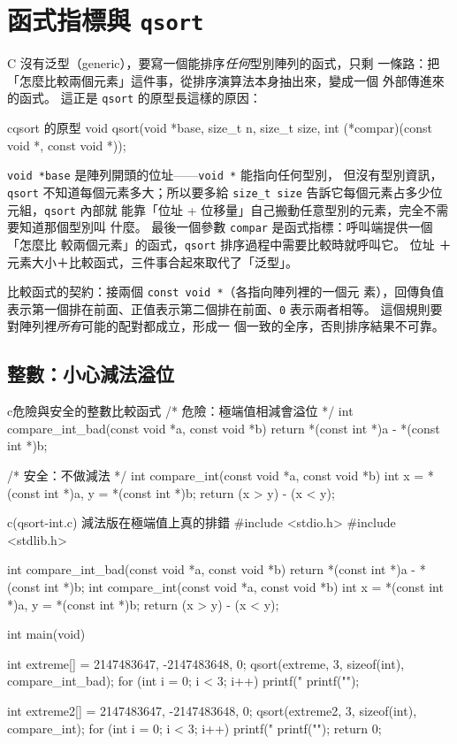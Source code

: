 \section{函式指標與 \texttt{qsort}}
\label{sec:sl-qsort}

C 沒有泛型（generic），要寫一個能排序\textit{任何}型別陣列的函式，只剩
一條路：把「怎麼比較兩個元素」這件事，從排序演算法本身抽出來，變成一個
外部傳進來的函式。 這正是 \texttt{qsort} 的原型長這樣的原因：

\begin{code}{c}{qsort 的原型}
void qsort(void *base, size_t n, size_t size,
           int (*compar)(const void *, const void *));
\end{code}

\texttt{void *base} 是陣列開頭的位址——\texttt{void *} 能指向任何型別，
但沒有型別資訊，\texttt{qsort} 不知道每個元素多大；所以要多給
\texttt{size\_t size} 告訴它每個元素占多少位元組，\texttt{qsort} 內部就
能靠「位址 + 位移量」自己搬動任意型別的元素，完全不需要知道那個型別叫
什麼。 最後一個參數 \texttt{compar} 是函式指標：呼叫端提供一個「怎麼比
較兩個元素」的函式，\texttt{qsort} 排序過程中需要比較時就呼叫它。 位址
＋元素大小＋比較函式，三件事合起來取代了「泛型」。

比較函式的契約：接兩個 \texttt{const void *}（各指向陣列裡的一個元
素），回傳負值表示第一個排在前面、正值表示第二個排在前面、\texttt{0}
表示兩者相等。 這個規則要對陣列裡\textit{所有}可能的配對都成立，形成一
個一致的全序，否則排序結果不可靠。

\subsection{整數：小心減法溢位}

\begin{code}{c}{危險與安全的整數比較函式}
/* 危險：極端值相減會溢位 */
int compare_int_bad(const void *a, const void *b) {
    return *(const int *)a - *(const int *)b;
}

/* 安全：不做減法 */
int compare_int(const void *a, const void *b) {
    int x = *(const int *)a, y = *(const int *)b;
    return (x > y) - (x < y);
}
\end{code}

\begin{example}{c}{(qsort-int.c) 減法版在極端值上真的排錯}
#include <stdio.h>
#include <stdlib.h>

int compare_int_bad(const void *a, const void *b) {
    return *(const int *)a - *(const int *)b;
}
int compare_int(const void *a, const void *b) {
    int x = *(const int *)a, y = *(const int *)b;
    return (x > y) - (x < y);
}

int main(void) {
    int extreme[] = {2147483647, -2147483648, 0};
    qsort(extreme, 3, sizeof(int), compare_int_bad);
    for (int i = 0; i < 3; i++) printf("%
    printf("\n");

    int extreme2[] = {2147483647, -2147483648, 0};
    qsort(extreme2, 3, sizeof(int), compare_int);
    for (int i = 0; i < 3; i++) printf("%
    printf("\n");
    return 0;
}
\end{example}

